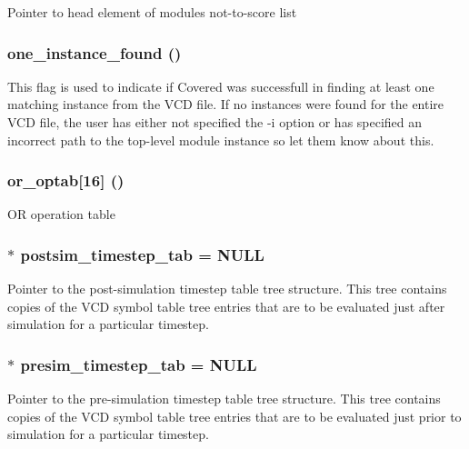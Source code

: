 Pointer to head element of modules not-to-score list 
\subsubsection{ {\bf one\_\-instance\_\-found} ()}\label{db_8c_a7}


This flag is used to indicate if Covered was successfull in finding at least one matching instance from the VCD file. If no instances were found for the entire VCD file, the user has either not specified the -i option or has specified an incorrect path to the top-level module instance so let them know about this. 
\subsubsection{ {\bf or\_\-optab}[16] ()}\label{db_8c_a5}


OR operation table 
\subsubsection{$\ast$ {\bf postsim\_\-timestep\_\-tab} = NULL}\label{db_8c_a19}


Pointer to the post-simulation timestep table tree structure. This tree contains copies of the VCD symbol table tree entries that are to be evaluated just after simulation for a particular timestep. 
\subsubsection{$\ast$ {\bf presim\_\-timestep\_\-tab} = NULL}\label{db_8c_a18}


Pointer to the pre-simulation timestep table tree structure. This tree contains copies of the VCD symbol table tree entries that are to be evaluated just prior to simulation for a particular timestep. 
